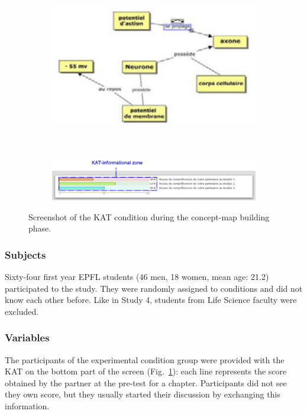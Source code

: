 \documentclass[natbib]{svjour3}
\begin{document}
\begin{figure}[h!t]
        \centering
        \begin{subfigure}{.6\textwidth}
            \includegraphics[width=\linewidth]{study5-conceptmap.png}
        \end{subfigure} \\
        \begin{subfigure}{.7\textwidth}
            \includegraphics[width=\linewidth]{study5-kat.png}
        \end{subfigure}
        \caption{Screenshot of the KAT condition during the concept-map building
        phase.}
        \label{study5:kat}
\end{figure}

\subsubsection*{Subjects}

Sixty-four first year EPFL students (46 men, 18 women, mean age: 21.2)
participated to the study. They were randomly assigned to conditions and
did not know each other before. Like in Study 4, students from Life Science
faculty were excluded.

\subsubsection*{Variables}

The participants of the experimental condition group were provided with the KAT
on the bottom part of the screen (Fig.~\ref{study5:kat}): each line represents
the score obtained by the partner at the pre-test for a chapter. Participants
did not see they own score, but they usually started their discussion by
exchanging this information.
\end{document}
